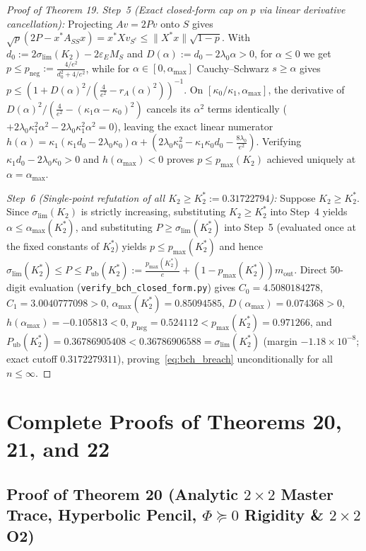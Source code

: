 \documentclass[10pt,letterpaper]{article}
\begin{document}
\begin{proof}[Proof of Theorem 19]
\emph{Step~5 (Exact closed-form cap on $p$ via linear derivative cancellation):} Projecting $Av = 2Pv$ onto $S$ gives $\sqrt{p}(2P - x^* A_{SS} x) = x^* X v_{S^c} \le \|X^* x\|\sqrt{1-p}$. With $d_0 := 2\sigma_{\lim}(K_2) - 2\varepsilon_E M_S$ and $D(\alpha) := d_0 - 2\lambda_0\alpha > 0$, for $\alpha \le 0$ we get $p \le p_{\mathrm{neg}} := \frac{4/e^2}{d_0^2 + 4/e^2}$, while for $\alpha \in [0, \alpha_{\max}]$ Cauchy--Schwarz $s \ge \alpha$ gives $p \le (1 + D(\alpha)^2 / (\frac{4}{e^2} - r_A(\alpha)^2))^{-1}$. On $[\kappa_0/\kappa_1, \alpha_{\max}]$, the derivative of $D(\alpha)^2 / (\frac{4}{e^2} - (\kappa_1\alpha - \kappa_0)^2)$ cancels its $\alpha^2$ terms identically ($+2\lambda_0\kappa_1^2\alpha^2 - 2\lambda_0\kappa_1^2\alpha^2 = 0$), leaving the exact linear numerator $h(\alpha) = \kappa_1(\kappa_1 d_0 - 2\lambda_0\kappa_0)\alpha + (2\lambda_0\kappa_0^2 - \kappa_1\kappa_0 d_0 - \frac{8\lambda_0}{e^2})$. Verifying $\kappa_1 d_0 - 2\lambda_0\kappa_0 > 0$ and $h(\alpha_{\max}) < 0$ proves $p \le p_{\max}(K_2)$ achieved uniquely at $\alpha = \alpha_{\max}$.

\emph{Step~6 (Single-point refutation of all $K_2 \ge K_2^* := 0.31722794$):} Suppose $K_2 \ge K_2^*$. Since $\sigma_{\lim}(K_2)$ is strictly increasing, substituting $K_2 \ge K_2^*$ into Step~4 yields $\alpha \le \alpha_{\max}(K_2^*)$, and substituting $P \ge \sigma_{\lim}(K_2^*)$ into Step~5 (evaluated once at the fixed constants of $K_2^*$) yields $p \le p_{\max}(K_2^*)$ and hence $\sigma_{\lim}(K_2^*) \le P \le P_{\mathrm{ub}}(K_2^*) := \frac{p_{\max}(K_2^*)}{e} + (1 - p_{\max}(K_2^*))m_{\mathrm{out}}$. Direct 50-digit evaluation (\texttt{verify\_bch\_closed\_form.py}) gives $C_0 = 4.5080184278$, $C_1 = 3.0040777098 > 0$, $\alpha_{\max}(K_2^*) = 0.85094585$, $D(\alpha_{\max}) = 0.074368 > 0$, $h(\alpha_{\max}) = -0.105813 < 0$, $p_{\mathrm{neg}} = 0.524112 < p_{\max}(K_2^*) = 0.971266$, and $P_{\mathrm{ub}}(K_2^*) = 0.36786905408 < 0.36786906588 = \sigma_{\lim}(K_2^*)$ (margin $-1.18\times 10^{-8}$; exact cutoff $0.3172279311$), proving~\eqref{eq:bch_breach} unconditionally for all $n \le \infty$.
\end{proof}

\newpage
\section{Complete Proofs of Theorems 20, 21, and 22}

\subsection{Proof of Theorem 20 (Analytic \texorpdfstring{$2\times 2$}{2x2} Master Trace, Hyperbolic Pencil, \texorpdfstring{$\Phi \succeq 0$}{Phi >= 0} Rigidity \& \texorpdfstring{$2\times 2$}{2x2} O2)}
\end{document}
